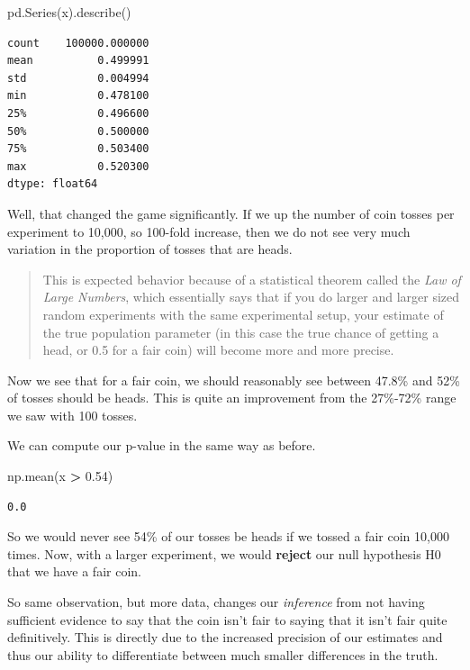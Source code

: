 \documentclass[
  letterpaper,
]{scrbook}
\newenvironment{Shaded}{\begin{snugshade}}{\end{snugshade}}
\newcommand{\FloatTok}[1]{\textcolor[rgb]{0.00,0.00,0.81}{#1}}
\newcommand{\NormalTok}[1]{#1}
\newcommand{\OperatorTok}[1]{\textcolor[rgb]{0.81,0.36,0.00}{\textbf{#1}}}
\begin{document}
\begin{Shaded}
\begin{Highlighting}[]
\NormalTok{pd.Series(x).describe()}
\end{Highlighting}
\end{Shaded}

\begin{verbatim}
count    100000.000000
mean          0.499991
std           0.004994
min           0.478100
25%           0.496600
50%           0.500000
75%           0.503400
max           0.520300
dtype: float64
\end{verbatim}

Well, that changed the game significantly. If we up the number of coin tosses per experiment to 10,000, so 100-fold increase, then we do not see very much variation in the proportion of tosses that are heads.

\begin{quote}
This is expected behavior because of a statistical theorem called the \emph{Law of Large Numbers}, which essentially says that if you do larger and larger sized random experiments with the same experimental setup, your estimate of the true population parameter (in this case the true chance of getting a head, or 0.5 for a fair coin) will become more and more precise.
\end{quote}

Now we see that for a fair coin, we should reasonably see between 47.8\% and 52\% of tosses should be heads. This is quite an improvement from the 27\%-72\% range we saw with 100 tosses.

We can compute our p-value in the same way as before.

\begin{Shaded}
\begin{Highlighting}[]
\NormalTok{np.mean(x }\OperatorTok{>} \FloatTok{0.54}\NormalTok{)}
\end{Highlighting}
\end{Shaded}

\begin{verbatim}
0.0
\end{verbatim}

So we would never see 54\% of our tosses be heads if we tossed a fair coin 10,000 times. Now, with a larger experiment, we would \textbf{reject} our null hypothesis H0 that we have a fair coin.

So same observation, but more data, changes our \emph{inference} from not having sufficient evidence to say that the coin isn't fair to saying that it isn't fair quite definitively. This is directly due to the increased precision of our estimates and thus our ability to differentiate between much smaller differences in the truth.
\end{document}
